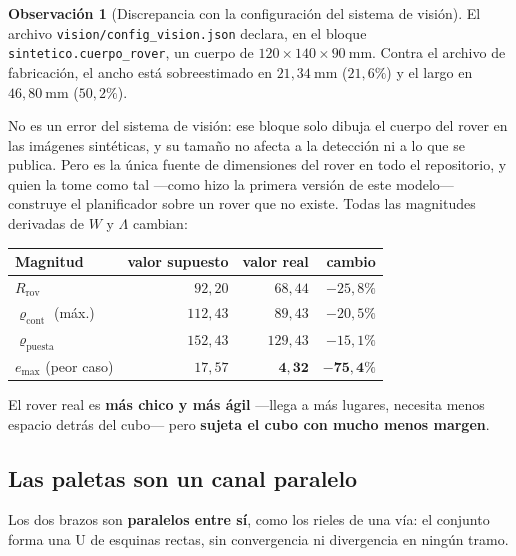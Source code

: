 \documentclass[11pt,a4paper]{article}
\theoremstyle{definition}
\newtheorem{observacion}[teorema]{Observación}
\begin{document}
\begin{observacion}[Discrepancia con la configuración del sistema de visión]
\label{obs:discrepancia}
El archivo \texttt{vision/config\_vision.json} declara, en el bloque
\texttt{sintetico.cuerpo\_rover}, un cuerpo de $120 \times 140 \times 90\ \mathrm{mm}$.
Contra el archivo de fabricación, el ancho está sobreestimado en $21{,}34\ \mathrm{mm}$
($21{,}6\%$) y el largo en $46{,}80\ \mathrm{mm}$ ($50{,}2\%$).

No es un error del sistema de visión: ese bloque solo dibuja el cuerpo del rover en las
imágenes sintéticas, y su tamaño no afecta a la detección ni a lo que se publica. Pero
es la única fuente de dimensiones del rover en todo el repositorio, y quien la tome como
tal ---como hizo la primera versión de este modelo--- construye el planificador sobre un
rover que no existe. Todas las magnitudes derivadas de $W$ y $\Lambda$ cambian:

\medskip
\centering
\begin{tabular}{lrrr}
\toprule
Magnitud & valor supuesto & valor real & cambio \\
\midrule
$R_{\mathrm{rov}}$ & $92{,}20$ & $68{,}44$ & $-25{,}8\%$ \\
$\varrho_{\mathrm{cont}}$ (máx.) & $112{,}43$ & $89{,}43$ & $-20{,}5\%$ \\
$\varrho_{\mathrm{puesta}}$ & $152{,}43$ & $129{,}43$ & $-15{,}1\%$ \\
$e_{\max}$ (peor caso) & $17{,}57$ & $\mathbf{4{,}32}$ & $\mathbf{-75{,}4\%}$ \\
\bottomrule
\end{tabular}

\raggedright
\medskip
El rover real es \textbf{más chico y más ágil} ---llega a más lugares, necesita menos
espacio detrás del cubo--- pero \textbf{sujeta el cubo con mucho menos margen}.
\end{observacion}

\subsection{Las paletas son un canal paralelo}
\label{sec:canal}

Los dos brazos son \textbf{paralelos entre sí}, como los rieles de una vía: el conjunto
forma una U de esquinas rectas, sin convergencia ni divergencia en ningún tramo.
\end{document}
